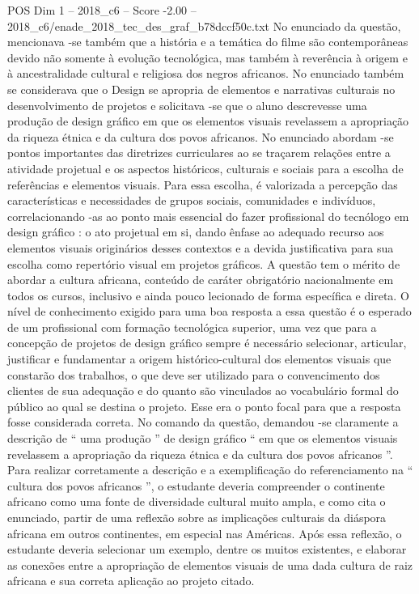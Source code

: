 \begin{textsample}{POS Dim 1 – 2018\_c6 – Score -2.00 – 2018\_c6/enade\_2018\_tec\_des\_graf\_b78dccf50c.txt}
No enunciado da questão, mencionava -se também que a história e a temática do filme são contemporâneas devido não somente à evolução tecnológica, mas também à reverência à origem e à ancestralidade cultural e religiosa dos negros africanos.
No enunciado também se considerava que o Design se apropria de elementos e narrativas culturais no desenvolvimento de projetos e solicitava -se que o aluno descrevesse uma produção de design gráfico em que os elementos visuais revelassem a apropriação da riqueza étnica e da cultura dos povos africanos.
No enunciado abordam -se pontos importantes das diretrizes curriculares ao se traçarem relações entre a atividade projetual e os aspectos históricos, culturais e sociais para a escolha de referências e elementos visuais.
Para essa escolha, é valorizada a percepção das características e necessidades de grupos sociais, comunidades e indivíduos, correlacionando -as ao ponto mais essencial do fazer profissional do tecnólogo em design gráfico : o ato projetual em si, dando ênfase ao adequado recurso aos elementos visuais originários desses contextos e a devida justificativa para sua escolha como repertório visual em projetos gráficos.
A questão tem o mérito de abordar a cultura africana, conteúdo de caráter obrigatório nacionalmente em todos os cursos, inclusivo e ainda pouco lecionado de forma específica e direta.
O nível de conhecimento exigido para uma boa resposta a essa questão é o esperado de um profissional com formação tecnológica superior, uma vez que para a concepção de projetos de design gráfico sempre é necessário selecionar, articular, justificar e fundamentar a origem histórico-cultural dos elementos visuais que constarão dos trabalhos, o que deve ser utilizado para o convencimento dos clientes de sua adequação e do quanto são vinculados ao vocabulário formal do público ao qual se destina o projeto.
Esse era o ponto focal para que a resposta fosse considerada correta.
No comando da questão, demandou -se claramente a descrição de “ uma produção ” de design gráfico “ em que os elementos visuais revelassem a apropriação da riqueza étnica e da cultura dos povos africanos ”.
Para realizar corretamente a descrição e a exemplificação do referenciamento na “ cultura dos povos africanos ”, o estudante deveria compreender o continente africano como uma fonte de diversidade cultural muito ampla, e como cita o enunciado, partir de uma reflexão sobre as implicações culturais da diáspora africana em outros continentes, em especial nas Américas.
Após essa reflexão, o estudante deveria selecionar um exemplo, dentre os muitos existentes, e elaborar as conexões entre a apropriação de elementos visuais de uma dada cultura de raiz africana e sua correta aplicação ao projeto citado.

\end{textsample}
